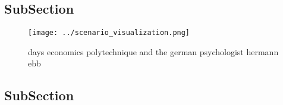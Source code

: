 \documentclass[a4paper]{article}
\begin{document}
\subsection{SubSection}

\begin{figure}
\centering
\texttt{[image: ../scenario\_visualization.png]}
\caption{ days economics polytechnique and the german psychologist hermann ebb
}
\end{figure}
 
\subsection{SubSection}
\end{document}
